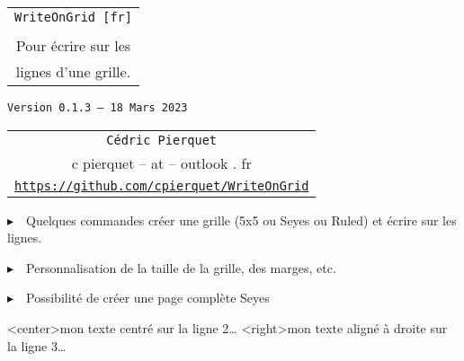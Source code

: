 \documentclass[a4paper]{article}
\def\TPversion{0.1.3}
\def\TPdate{18 Mars 2023}
\begin{document}
\pagestyle{fancy}

\thispagestyle{empty}

\vspace{2cm}

\begin{center}
	\begin{minipage}{0.75\linewidth}
	\begin{tcolorbox}[colframe=yellow,colback=yellow!15]
		\begin{center}
			\begin{tabular}{c}
				{\Huge \texttt{WriteOnGrid [fr]}}\\
				\\
				{\LARGE Pour écrire sur les} \\
				{\LARGE lignes d'une grille.}
			\end{tabular}
			
			\medskip
			
			{\small \texttt{Version \TPversion{} -- \TPdate}}
		\end{center}
	\end{tcolorbox}
\end{minipage}
\end{center}

\vspace{0.5cm}

\begin{center}
	\begin{tabular}{c}
	\texttt{Cédric Pierquet}\\
	{\ttfamily c pierquet -- at -- outlook . fr}\\
	\texttt{\url{https://github.com/cpierquet/WriteOnGrid}}
\end{tabular}
\end{center}

\vspace{0.5cm}

{$\blacktriangleright$~~Quelques commandes créer une grille (5x5 ou Seyes ou Ruled) et écrire \og sur \fg{} les lignes.}

\smallskip

{$\blacktriangleright$~~Personnalisation de la taille de la grille, des marges, etc.}

\smallskip

{$\blacktriangleright$~~Possibilité de créer une page complète Seyes}

\vspace{1cm}

\begin{center}
	\begin{EnvQuadrillage}[NbCarreaux=22x8]
	\EcrireLigne<center>{mon texte centré sur la ligne 2\ldots}
	\EcrireLigne<right>{mon texte aligné à droite sur la ligne 3\ldots}
	\PasseLigne
\end{EnvQuadrillage}
\end{center}
\end{document}
